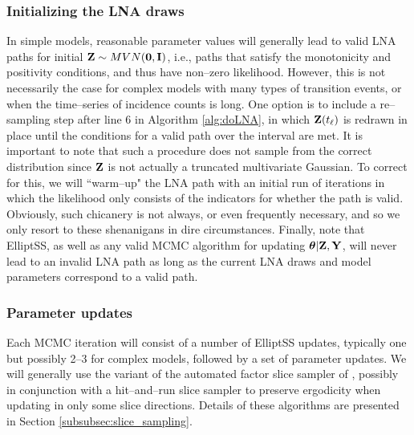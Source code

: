 \subsubsection{Initializing the LNA draws}
\label{subsubsec:lna_init}
In simple models, reasonable parameter values will generally lead to valid LNA paths for initial $ \mathbf{Z}\sim MVN(\boldsymbol{0},\mathbf{I}) $, i.e., paths that satisfy the monotonicity and positivity conditions, and thus have non--zero likelihood. However, this is not necessarily the case for complex models with many types of transition events, or when the time--series of incidence counts is long. One option is to include a re--sampling step after line 6 in Algorithm \ref{alg:doLNA}, in which $ \mathbf{Z}(t_\ell) $ is redrawn in place until the conditions for a valid path over the interval are met. It is important to note that such a procedure does not sample from the correct distribution since $ \mathbf{Z} $ is not actually a truncated multivariate Gaussian. To correct for this, we will ``warm--up" the LNA path with an initial run of \doElliptSS iterations in which the likelihood only consists of the indicators for whether the path is valid. Obviously, such chicanery is not always, or even frequently necessary, and so we only resort to these shenanigans in dire circumstances. Finally, note that ElliptSS, as well as any valid MCMC algorithm for updating $ \boldsymbol{\theta}|\mathbf{Z},\mathbf{Y} $, will never lead to an invalid LNA path as long as the current LNA draws and model parameters correspond to a valid path.

\subsubsection{Parameter updates}
\label{subsubsec:lna_param_updates}
Each MCMC iteration will consist of a number of ElliptSS updates, typically one but possibly 2--3 for complex models, followed by a set of parameter updates. We will generally use the variant of the automated factor slice sampler of \cite{tibbits2014automated}, possibly in conjunction with a hit--and--run slice sampler to preserve ergodicity when updating in only some slice directions. Details of these algorithms are presented in Section \ref{subsubsec:slice_sampling}. 
